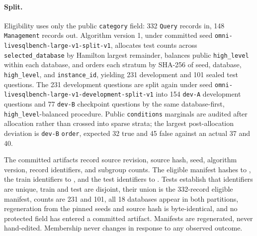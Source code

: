 \paragraph{Split.}
Eligibility uses only the public \texttt{category} field: 332 \texttt{Query}
records in, 148 \texttt{Management} records out. Algorithm version 1, under
committed seed \texttt{omni-livesqlbench-large-v1-split-v1}, allocates test counts
across \texttt{selected\_database} by Hamilton largest remainder, balances public
\texttt{high\_level} within each database, and orders each stratum by SHA-256 of
seed, database, \texttt{high\_level}, and \texttt{instance\_id}, yielding 231
development and 101 sealed test questions. The 231 development questions are
split again under seed
\texttt{omni-livesqlbench-large-v1-development-split-v1} into 154 \texttt{dev-A}
development questions and 77 \texttt{dev-B} checkpoint questions by the same
database-first, \texttt{high\_level}-balanced procedure. Public
\texttt{conditions} marginals are audited after allocation rather than crossed
into sparse strata; the largest post-allocation deviation is \texttt{dev-B}
\texttt{order}, expected 32 true and 45 false against an actual 37 and 40.

The committed artifacts record source revision, source hash, seed, algorithm
version, record identifiers, and subgroup counts. The eligible manifest hashes to
, the
train identifiers to
, and the
test identifiers to
. Tests
establish that identifiers are unique, train and test are disjoint, their union
is the 332-record eligible manifest, counts are 231 and 101, all 18 databases
appear in both partitions, regeneration from the pinned seeds and source hash is
byte-identical, and no protected field has entered a committed artifact.
Manifests are regenerated, never hand-edited. Membership never changes in
response to any observed outcome.

